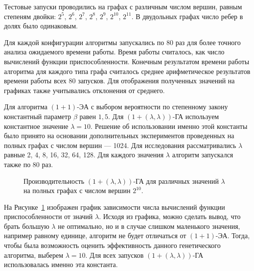 \documentclass[times]{itmo-student-thesis}
\newcommand{\alglambdaf}{${(1 + (\lambda , \lambda))}$-ГА\xspace}
\newcommand{\oea}{\mbox{$(1 + 1)$-ЭА}\xspace}
\newcommand{\ollga}{${(1 + (\lambda , \lambda))}$-ГА\xspace}
\begin{document}
Тестовые запуски проводились на графах с различным числом вершин, равным степеням двойки: $2^5$, $2^6$, $2^7$, $2^8$, $2^9$, $2^{10}$, $2^{11}$.
В двудольных графах число ребер в долях было одинаковым.

Для каждой конфигурации алгоритмы запускались по 80 раз для более точного анализа ожидаемого времени работы. Время работы считалось, как число вычислений функции приспособленности. Конечным результатом времени работы алгоритма для каждого типа графа считалось среднее арифметическое результатов времени работы всех 80 запусков. Для отображения полученных значений на графиках также учитывались отклонения от среднего.

Для алгоритма \oea с выбором вероятности по степенному закону константный параметр $\beta$ равен $1,5$. Для \alglambdaf используем константное значение $\lambda = 10$.
Решение об использовании именно этой константы было принято на основании дополнительных экспериментов проведенных на полных графах с числом вершин --- 1024. Для исследования рассматривались $\lambda$ равные 2, 4, 8, 16, 32, 64, 128. Для каждого значения $\lambda$ алгоритм запускался также по 80 раз.

\begin{figure}[t!]
\caption{Производительность \ollga для различных значений $\lambda$ на полных графах с числом вершин $2^{10}$.}
\label{fig:lambda}
\end{figure}

На Рисунке~\ref{fig:lambda} изображен график зависимости числа вычислений функции приспособленности от значий $\lambda$. Исходя из графика, можно сделать вывод, что брать большую $\lambda$ не оптимально, но и в случае слишком маленького значения, например равному единице, алгоритм не будет отличаться от \oea. Тогда, чтобы была возможность оценить эффективность данного генетического алгоритма, выберем $\lambda = 10$. Для всех запусков \alglambdaf использовалась именно эта константа.
\end{document}
